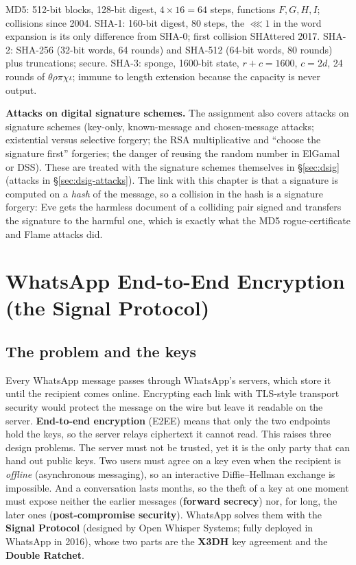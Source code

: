 \begin{mustknow}
MD5: 512-bit blocks, 128-bit digest, $4 \times 16 = 64$ steps, functions $F, G, H, I$; collisions since 2004. SHA-1: 160-bit digest, 80 steps, the $\lll 1$ in the word expansion is its only difference from SHA-0; first collision SHAttered 2017. SHA-2: SHA-256 (32-bit words, 64 rounds) and SHA-512 (64-bit words, 80 rounds) plus truncations; secure. SHA-3: sponge, 1600-bit state, $r + c = 1600$, $c = 2d$, 24 rounds of $\theta\rho\pi\chi\iota$; immune to length extension because the capacity is never output.
\end{mustknow}

\textbf{Attacks on digital signature schemes.} The assignment also covers attacks on signature schemes (key-only, known-message and chosen-message attacks; existential versus selective forgery; the RSA multiplicative and ``choose the signature first'' forgeries; the danger of reusing the random number in ElGamal or DSS). These are treated with the signature schemes themselves in \S\ref{sec:dsig} (attacks in \S\ref{sec:dsig-attacks}). The link with this chapter is that a signature is computed on a \emph{hash} of the message, so a collision in the hash is a signature forgery: Eve gets the harmless document of a colliding pair signed and transfers the signature to the harmful one, which is exactly what the MD5 rogue-certificate and Flame attacks did.

\section{WhatsApp End-to-End Encryption (the Signal Protocol)}\label{sec:whatsapp}

\subsection{The problem and the keys \hot\new}

Every WhatsApp message passes through WhatsApp's servers, which store it until the recipient comes online. Encrypting each link with TLS-style transport security would protect the message on the wire but leave it readable on the server. \textbf{End-to-end encryption} (E2EE) means that only the two endpoints hold the keys, so the server relays ciphertext it cannot read. This raises three design problems. The server must not be trusted, yet it is the only party that can hand out public keys. Two users must agree on a key even when the recipient is \emph{offline} (asynchronous messaging), so an interactive Diffie--Hellman exchange is impossible. And a conversation lasts months, so the theft of a key at one moment must expose neither the earlier messages (\textbf{forward secrecy}) nor, for long, the later ones (\textbf{post-compromise security}). WhatsApp solves them with the \textbf{Signal Protocol} (designed by Open Whisper Systems; fully deployed in WhatsApp in 2016), whose two parts are the \textbf{X3DH} key agreement and the \textbf{Double Ratchet}.

